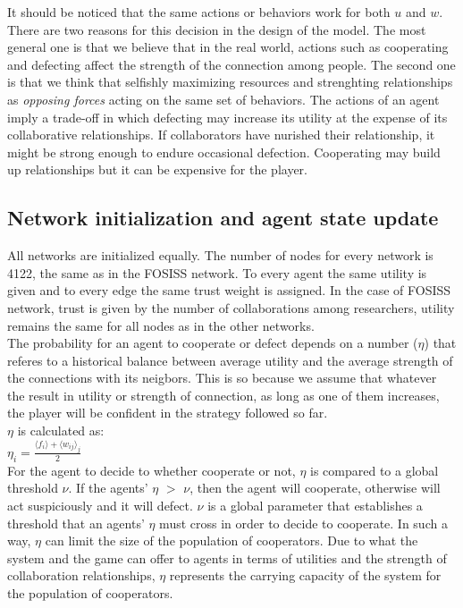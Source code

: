 \documentclass[11pt]{article}
\begin{document}
{\color{red} It should be noticed that the same actions or behaviors work for
  both $u$ and $w$. There are two reasons for this decision in the design of the
model. The most general one is that we believe that in the real world,
actions such as cooperating and defecting affect the strength of the connection
among people. The second one is that we think that selfishly maximizing resources and
strenghting relationships as \emph{opposing forces} acting on the same set of
behaviors. The actions of an agent imply a trade-off in which defecting may
increase its utility at the expense of its collaborative relationships. If
collaborators have nurished their relationship, it might be strong enough to
endure occasional defection. Cooperating may build up relationships but it can be
expensive for the player.}

\subsection{Network initialization and agent state update}

All networks are initialized equally. The number of nodes for every network is 4122, the same as in the FOSISS network.
To every agent the same utility is given and to every edge the same trust weight is assigned. In the case of FOSISS
network, trust is given by the number of collaborations among researchers, utility remains the same for all nodes as in
the other networks.\\  

The probability for an agent to cooperate or defect depends on a
number ($\eta$) that referes to a historical balance between average utility and
the average strength of the connections with its neigbors.   {\color{red} This is so
  because we assume that whatever the result in utility or strength of
  connection, as long as one of them increases, the player will be confident in
  the strategy followed so far}.\\ 


$\eta$ is calculated as:\\ 


$\eta_i = \frac{\langle f_i \rangle + \langle w_{ij} \rangle _j}{2}$\\

{\color{red} For the agent to decide to whether cooperate or not, $\eta$ is
  compared to a global threshold $\nu$. If the agents' $\eta$ $>$ $\nu$,
  then the agent will cooperate, otherwise will act suspiciously and it will
  defect. $\nu$ is a global parameter that establishes a threshold that an
  agents' $\eta$ must cross in order to decide to cooperate. In such a way,
  $\eta$ can limit the size of the population of cooperators. Due
  to what the system and the game can offer to agents in terms of utilities and the strength
  of collaboration relationships, $\eta$ represents the carrying capacity of the
  system for the population of cooperators}.  
\end{document}
